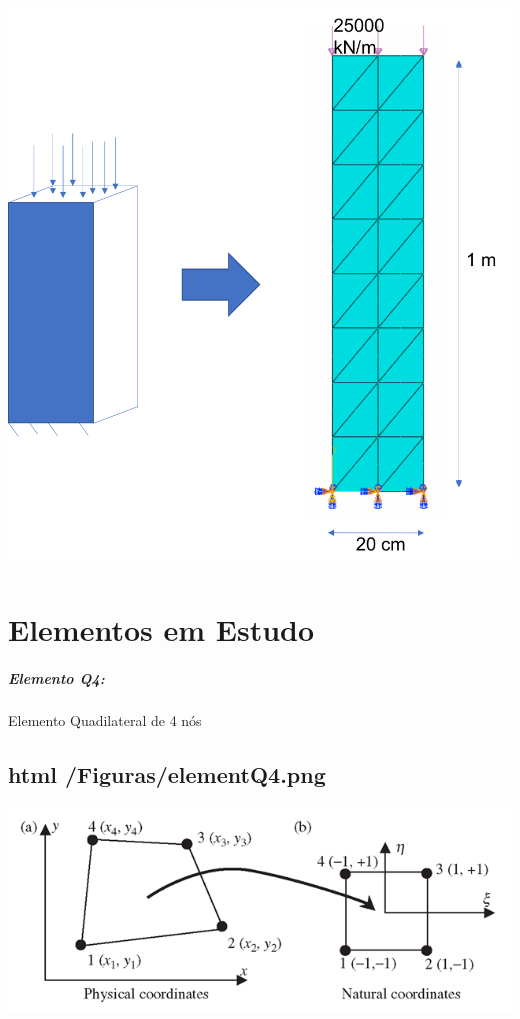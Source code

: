 \begin{DoxyImageNoCaption}
  \mbox{\includegraphics[width=\textwidth,height=\textheight/2,keepaspectratio=true]{problema.png}}
\end{DoxyImageNoCaption}
 

\section*{Elementos em Estudo}

\subparagraph*{Elemento Q4\+:}


\begin{DoxyItemize}
\item Elemento Quadilateral de 4 nós
\end{DoxyItemize}

\subsection*{html /\+Figuras/element\+Q4.png}


\begin{DoxyImageNoCaption}
  \mbox{\includegraphics[width=\textwidth,height=\textheight/2,keepaspectratio=true]{elementQ4.png}}
\end{DoxyImageNoCaption}
 

